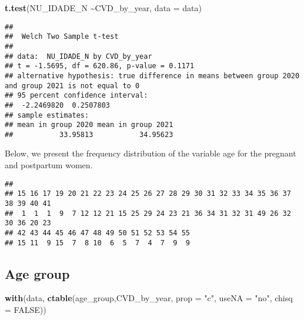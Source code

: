 \documentclass[
]{article}
\newenvironment{Shaded}{\begin{snugshade}}{\end{snugshade}}
\newcommand{\AttributeTok}[1]{\textcolor[rgb]{0.13,0.29,0.53}{#1}}
\newcommand{\ConstantTok}[1]{\textcolor[rgb]{0.56,0.35,0.01}{#1}}
\newcommand{\FunctionTok}[1]{\textcolor[rgb]{0.13,0.29,0.53}{\textbf{#1}}}
\newcommand{\NormalTok}[1]{#1}
\newcommand{\SpecialCharTok}[1]{\textcolor[rgb]{0.81,0.36,0.00}{\textbf{#1}}}
\newcommand{\StringTok}[1]{\textcolor[rgb]{0.31,0.60,0.02}{#1}}
\begin{document}
\begin{Shaded}
\begin{Highlighting}[]
\FunctionTok{t.test}\NormalTok{(NU\_IDADE\_N }\SpecialCharTok{\textasciitilde{}}\NormalTok{CVD\_by\_year, }\AttributeTok{data =}\NormalTok{ data)}
\end{Highlighting}
\end{Shaded}

\begin{verbatim}
## 
##  Welch Two Sample t-test
## 
## data:  NU_IDADE_N by CVD_by_year
## t = -1.5695, df = 620.86, p-value = 0.1171
## alternative hypothesis: true difference in means between group 2020 and group 2021 is not equal to 0
## 95 percent confidence interval:
##  -2.2469820  0.2507803
## sample estimates:
## mean in group 2020 mean in group 2021 
##           33.95813           34.95623
\end{verbatim}

Below, we present the frequency distribution of the variable age for the
pregnant and postpartum women.

\begin{Shaded}
\end{Shaded}

\begin{verbatim}
## 
## 15 16 17 19 20 21 22 23 24 25 26 27 28 29 30 31 32 33 34 35 36 37 38 39 40 41 
##  1  1  1  9  7 12 12 21 15 25 29 24 23 21 36 34 31 32 31 49 26 32 30 36 20 23 
## 42 43 44 45 46 47 48 49 50 51 52 53 54 55 
## 15 11  9 15  7  8 10  6  5  7  4  7  9  9
\end{verbatim}

\hypertarget{age-group}{%
\subsection{Age group}\label{age-group}}

\begin{Shaded}
\begin{Highlighting}[]
\FunctionTok{with}\NormalTok{(data, }\FunctionTok{ctable}\NormalTok{(age\_group,CVD\_by\_year, }\AttributeTok{prop =} \StringTok{"c"}\NormalTok{, }\AttributeTok{useNA =} \StringTok{"no"}\NormalTok{, }\AttributeTok{chisq =} \ConstantTok{FALSE}\NormalTok{))}
\end{Highlighting}
\end{Shaded}
\end{document}
